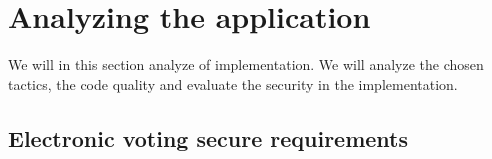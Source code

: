 \section{Analyzing the application}
We will in this section analyze of implementation. We will analyze the chosen tactics, the code quality and evaluate the security in the implementation. 

\subsection{Electronic voting secure requirements}
